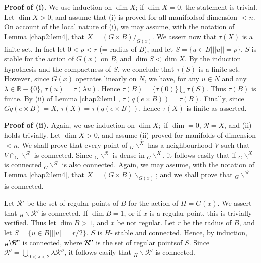 \medskip
\noindent \textbf{Proof of (i).} 
  We use  induction on $ \dim  X $; if  $ \dim X = 0 $, the  statement 
  is trivial. Let $ \dim X > 0 $, and assume that  (i) is proved
  for all manifolds\pageoriginale of  dimension $ < n $. On account of
  the  local 
  nature of (i), we may assume, with the notation of Lemma  \ref{chap2:lem4},
  that  $ X = ( G \times  B ) /_{G (x)}$. We assert now that  $\tau
  (X)$ is a finite set. In fact let  $ 0 < \rho < r $  (= radius  of
  $B$), 
  and let  $S = \{ u \in B \big| || u || = \rho \}$. $S$ is  stable for
  the action of $G(x)$ on $B$, and $\dim S< \dim X$. By the induction
  hypothesis and the compactness of $S$, we conclude that $\tau (S)$ is
  a finite set. However, since $G(x)$ operates linearly on $ N $, we
  have, for any $ u \in N $ and any $ \lambda  \in  \mathbb{R} - \{ 0 \}
  $, $ \tau ( u )  = \tau ( \lambda u  ) $. Hence $ \tau (B)  = \{  \tau
  (0) \} \bigcup  \tau (S) $. Thus $ \tau (B) $ is finite. By (ii)
  of Lemma \ref{chap2:lem1}, $ \tau ( q ( e \times B )) = \tau (B)
  $. Finally, since 
  $ G q ( e \times B )  =   X $, $ \tau (X)  =  \tau ( q ( e \times B ))
  $, hence $ \tau (X) $ is  finite as asserted. 
  
\medskip
\noindent \textbf{Proof of (ii).} 
  Again, we use  induction on  $ \dim X; $  if  $ \dim = 0 $, $
  \mathcal{R} =  X $, and (ii)  holds trivially. Let 
  $\dim X > 0$, and  assume (ii) proved for  manifolds of dimension 
  $< n$. We shall prove that every point of  $ _G \backslash^X $ has a
  neighbourhood  $ V $  such that  
  $V \cap  _G \backslash ^\mathcal{R}$  is connected. Since 
  $_G \backslash ^\mathcal{R} $  is dense in  
  $_G \backslash ^X $, it follows easily that if $ _G \backslash ^X $
  is  connected $ _G \backslash ^\mathcal{R} $  is also
  connected. Again, we may  assume, with the notation of   Lemma \ref{chap2:lem4},
  that $ X = ( G \times B ) \backslash _{G (x) }$; and we shall prove
  that  $ _G \backslash ^\mathcal{R} $  is connected.  

Let $\mathcal{R}' $ be the  set of regular points of  $B$ for  the
action  of  $ H = G (x) $. We assert that $_H  \backslash
\mathcal{R}' $  is  connected. If  $ \dim B = 1 $, or  if  $ x $ is
a regular point, this  is trivially verified. Thus let $ \dim B  >
1 $, and  $x$ be not  regular. Let $r$  be the radius of  $ B $, and
let $ S = \{ u \in B \big |  || u || = r/2  \} $. $S$  is $H$-
stable and connected. Hence, by induction, $ _{H} \backslash
\mathcal{R}" $  is  connected, where $ \mathcal{R}" $  is  the  set
of  regular points\pageoriginale of $S$. Since $ \mathcal{R}' =  \bigcup
\limits_{0 < \lambda < 2 } \lambda  \mathcal{R}'' $, it follows
easily that  $ _H  \backslash  \mathcal{R}' $ is  connected. 

